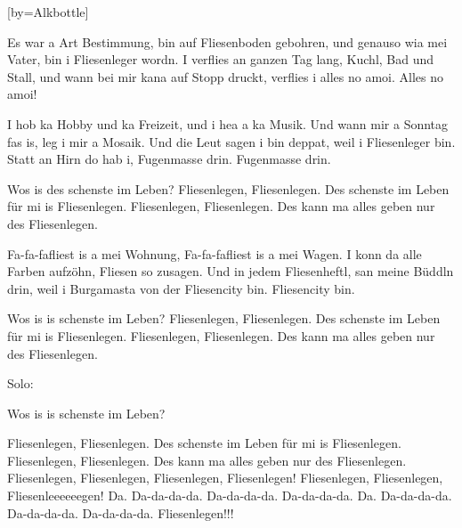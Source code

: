 [by={Alkbottle}]


\chordson




\beginverse

Es war a Art Bestimmung, bin auf Fliesenboden gebohren,
und genauso wia mei Vater, bin i Fliesenleger wordn.
I verflies an ganzen Tag lang, Kuchl, Bad und Stall,
und wann bei mir kana auf Stopp druckt, verflies i alles no amoi.
Alles no amoi!

\endverse

\beginverse

I hob ka Hobby und ka Freizeit, und i hea a ka Musik.
Und wann mir a Sonntag fas is, leg i mir a Mosaik.
Und die Leut sagen i bin deppat, weil i Fliesenleger bin.
Statt an Hirn do hab i, Fugenmasse drin. Fugenmasse drin.

\endverse


\beginchorus
Wos is des schenste im Leben?
Fliesenlegen, Fliesenlegen. Des schenste im Leben für mi is Fliesenlegen.
Fliesenlegen, Fliesenlegen. Des kann ma alles geben nur des Fliesenlegen.
\endchorus

\beginverse
Fa-fa-fafliest is a mei Wohnung, Fa-fa-fafliest is a mei Wagen.
I konn da alle Farben aufzöhn, Fliesen so zusagen.
Und in jedem Fliesenheftl, san meine Büddln drin,
weil i Burgamasta von der Fliesencity bin. Fliesencity bin.
\endverse

\beginchorus
Wos is is schenste im Leben?
Fliesenlegen, Fliesenlegen. Des schenste im Leben für mi is Fliesenlegen.
Fliesenlegen, Fliesenlegen. Des kann ma alles geben nur des Fliesenlegen.
\endchorus

\beginverse
Solo:
\endverse

\beginverse
Wos is is schenste im Leben?
\endverse

\beginchorus
Fliesenlegen, Fliesenlegen. Des schenste im Leben für mi is Fliesenlegen.
Fliesenlegen, Fliesenlegen. Des kann ma alles geben nur des Fliesenlegen.
Fliesenlegen, Fliesenlegen, Fliesenlegen, Fliesenlegen!
Fliesenlegen, Fliesenlegen, Fliesenleeeeeegen!
Da. Da-da-da-da. Da-da-da-da. Da-da-da-da.
Da. Da-da-da-da. Da-da-da-da. Da-da-da-da.
Fliesenlegen!!!
\endchorus
\vspace{7cm}
\endsong
